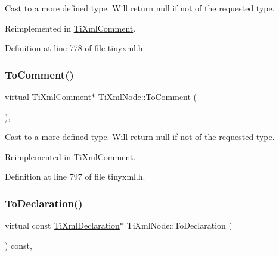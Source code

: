 Cast to a more defined type. Will return null if not of the requested type. 



Reimplemented in \hyperlink{class_ti_xml_comment_a1032e176d3eb73017ceabc698cac0f16}{Ti\+Xml\+Comment}.



Definition at line 778 of file tinyxml.\+h.

\hypertarget{class_ti_xml_node_a383e06a0787f7063953934867990f849}{}\label{class_ti_xml_node_a383e06a0787f7063953934867990f849} 
\subsubsection{\texorpdfstring{To\+Comment()}{ToComment()}\hspace{0.1cm}{\footnotesize\ttfamily [2/2]}}
{\footnotesize\ttfamily virtual \hyperlink{class_ti_xml_comment}{Ti\+Xml\+Comment}$\ast$ Ti\+Xml\+Node\+::\+To\+Comment (\begin{DoxyParamCaption}{ }\end{DoxyParamCaption})\hspace{0.3cm}{\ttfamily [inline]}, {\ttfamily [virtual]}}



Cast to a more defined type. Will return null if not of the requested type. 



Reimplemented in \hyperlink{class_ti_xml_comment_acc7c7e07e13c23f17797d642981511df}{Ti\+Xml\+Comment}.



Definition at line 797 of file tinyxml.\+h.

\hypertarget{class_ti_xml_node_a0dc0831e89d499ca911a3be61a413d45}{}\label{class_ti_xml_node_a0dc0831e89d499ca911a3be61a413d45} 
\subsubsection{\texorpdfstring{To\+Declaration()}{ToDeclaration()}\hspace{0.1cm}{\footnotesize\ttfamily [1/2]}}
{\footnotesize\ttfamily virtual const \hyperlink{class_ti_xml_declaration}{Ti\+Xml\+Declaration}$\ast$ Ti\+Xml\+Node\+::\+To\+Declaration (\begin{DoxyParamCaption}{ }\end{DoxyParamCaption}) const\hspace{0.3cm}{\ttfamily [inline]}, {\ttfamily [virtual]}}



